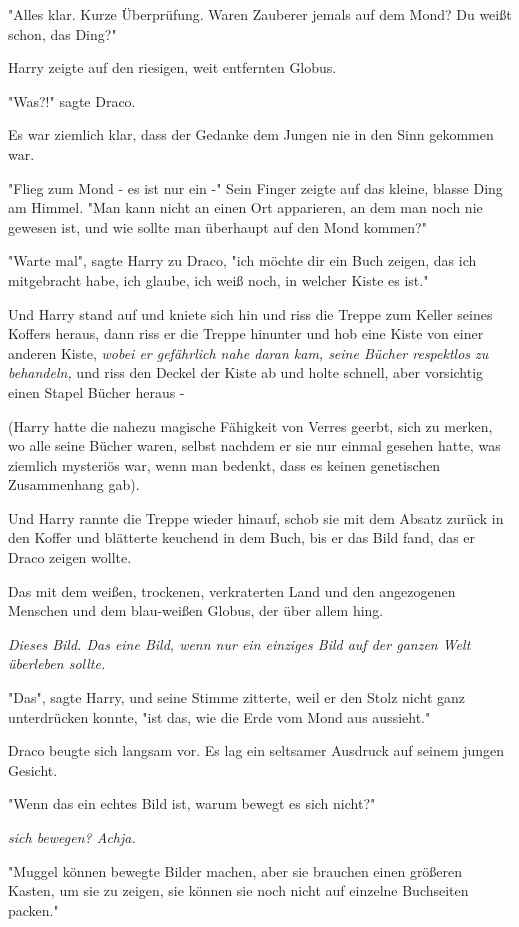 {"Alles klar. Kurze Überprüfung. Waren Zauberer jemals auf dem Mond? Du weißt schon, das Ding?"

Harry zeigte auf den riesigen, weit entfernten Globus.

"Was?!" sagte Draco.

Es war ziemlich klar, dass der Gedanke dem Jungen nie in den Sinn gekommen war.

"Flieg zum Mond - es ist nur ein -" Sein Finger zeigte auf das kleine, blasse Ding am Himmel. "Man kann nicht an einen Ort apparieren, an dem man noch nie gewesen ist, und wie sollte man überhaupt auf den Mond kommen?"

"Warte mal", sagte Harry zu Draco, "ich möchte dir ein Buch zeigen, das ich mitgebracht habe, ich glaube, ich weiß noch, in welcher Kiste es ist."

Und Harry stand auf und kniete sich hin und riss die Treppe zum Keller seines Koffers heraus, dann riss er die Treppe hinunter und hob eine Kiste von einer anderen Kiste, \emph{wobei er gefährlich nahe daran kam, seine Bücher respektlos zu behandeln,} und riss den Deckel der Kiste ab und holte schnell, aber vorsichtig einen Stapel Bücher heraus -

(Harry hatte die nahezu magische Fähigkeit von Verres geerbt, sich zu merken, wo alle seine Bücher waren, selbst nachdem er sie nur einmal gesehen hatte, was ziemlich mysteriös war, wenn man bedenkt, dass es keinen genetischen Zusammenhang gab).

Und Harry rannte die Treppe wieder hinauf, schob sie mit dem Absatz zurück in den Koffer und blätterte keuchend in dem Buch, bis er das Bild fand, das er Draco zeigen wollte.

Das mit dem weißen, trockenen, verkraterten Land und den angezogenen Menschen und dem blau-weißen Globus, der über allem hing.

\emph{Dieses Bild. Das eine Bild, wenn nur ein einziges Bild auf der ganzen Welt überleben sollte.}

"Das", sagte Harry, und seine Stimme zitterte, weil er den Stolz nicht ganz unterdrücken konnte, "ist das, wie die Erde vom Mond aus aussieht."

Draco beugte sich langsam vor. Es lag ein seltsamer Ausdruck auf seinem jungen Gesicht.

"Wenn das ein echtes Bild ist, warum bewegt es sich nicht?"

\emph{sich bewegen? Achja.}

"Muggel können bewegte Bilder machen, aber sie brauchen einen größeren Kasten, um sie zu zeigen, sie können sie noch nicht auf einzelne Buchseiten packen."

}
